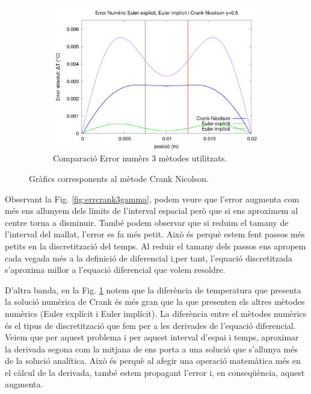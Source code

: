 \documentclass[11pt]{article}
\begin{document}
\begin{figure}[hbt!]
    \begin{subfigure}{0.3\textwidth}
        \centering
        \includegraphics[width=\textwidth]{errtemp3met.png}
        \caption{Comparació Error numèrs 3 mètodes utilitzats.}
        \label{fig:errtemp3met}
    \end{subfigure}
    \hspace{0.025\textwidth}
    \caption{Gràfics corresponents al mètode Crank Nicolson.}
    \label{fig:dues_imatges}
\end{figure}

Observant la Fig. \ref{fig:errcrank3gamma}, podem veure que l'error augmenta com més ens allunyem dels límits de l'interval espacial però que si ens aproximem al centre torna a disminuir. 
També podem observar que si reduim el tamany de l'interval del mallat, l'error es fa més petit. 
Això és perquè estem fent passos més petits en la discretització del temps. 
Al reduir el tamany dels passos ens apropem cada vegada més a la definició de diferencial i,per tant, l'equació discretitzada s'aproxima millor a l'equació diferencial que volem resoldre.

D'altra banda, en la Fig. \ref{fig:errtemp3met} notem que la diferència de temperatura que presenta la solució numèrica de Crank és més gran que la que presenten els altres mètodes numèrics (Euler explícit i Euler implícit). 
La diferència entre el mètodes numèrics és el tipus de discretització que fem per a les derivades de l'equació diferencial. Veiem que per aquest problema i per aquest interval d'espai i temps, aproximar la derivada segona com la mitjana de ens porta a una solució que s'allunya més de la solució analítica. Això és perquè al afegir una operació matemàtica més en el càlcul de la derivada, també estem propagant l'error i, en conseqüència, aquest augmenta.
\end{document}
